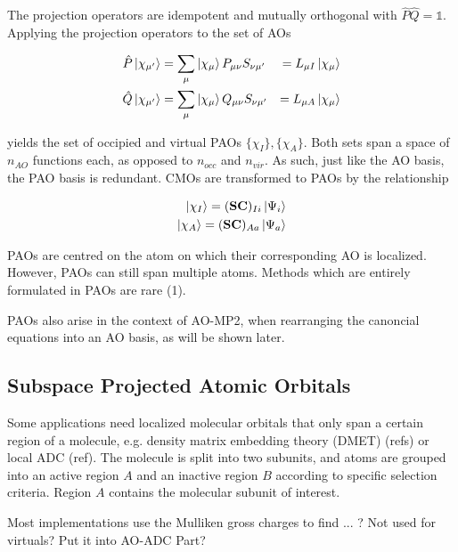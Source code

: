 The projection operators are idempotent and mutually orthogonal with $\hat{P}\hat{Q} = \mathbb{1}$. Applying the projection operators to the set of AOs 

\begin{eqnarray}
\hat{P} \ket{\chi_{\mu'}} &= \sum_{\mu} \ket{\chi_{\mu}} P_{\mu\nu} S_{\nu\mu'} &= L_{\mu I} \ket{\chi_{\mu}} \\
\hat{Q} \ket{\chi_{\mu'}} &= \sum_{\mu} \ket{\chi_{\mu}} Q_{\mu\nu} S_{\nu\mu'} &= L_{\mu A} \ket{\chi_{\mu}}
\end{eqnarray} 

\noindent yields the set of occipied and virtual PAOs $\{\chi_I\},\{\chi_A\}$. Both sets span a space of $n_{AO}$ functions each, as opposed to $n_{occ}$ and $n_{vir}$. As such, just like the AO basis, the PAO basis is redundant. CMOs are transformed to PAOs by the relationship

\begin{eqnarray}
\ket{\chi_I} = (\mathbf{SC})_{Ii} \ket{\Psi_i} \\
\ket{\chi_A} = (\mathbf{SC})_{Aa} \ket{\Psi_a}
\end{eqnarray}

PAOs are centred on the atom on which their corresponding AO is localized. However, PAOs can still span multiple atoms. Methods which are entirely formulated in PAOs are rare (1).

PAOs also arise in the context of AO-MP2, when rearranging the canoncial equations into an AO basis, as will be shown later.

\subsection{Subspace Projected Atomic Orbitals}

Some applications need localized molecular orbitals that only span a certain region of a molecule, e.g. density matrix embedding theory (DMET) (refs) or local ADC (ref). The molecule is split into two subunits, and atoms are grouped into an active region $A$ and an inactive region $B$ according to specific selection criteria. Region $A$ contains the molecular subunit of interest. 

Most implementations use the Mulliken gross charges to find
... ? Not used for virtuals? Put it into AO-ADC Part?


